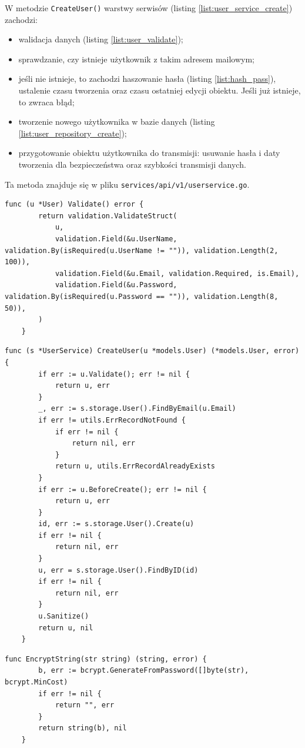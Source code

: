 W metodzie \texttt{CreateUser()} warstwy serwisów (listing \ref{list:user_service_create}) zachodzi:
\begin{itemize}
\item walidacja danych (listing \ref{list:user_validate});
\item sprawdzanie, czy istnieje użytkownik z takim adresem mailowym;
\item jeśli nie istnieje, to zachodzi haszowanie hasła (listing \ref{list:hash_pass}), ustalenie czasu tworzenia oraz czasu ostatniej edycji obiektu. Jeśli już istnieje, to zwraca błąd;
\item tworzenie nowego użytkownika w bazie danych (listing \ref{list:user_repository_create});
\item przygotowanie obiektu użytkownika do transmisji: usuwanie hasła i daty tworzenia dla bezpieczeństwa oraz szybkości transmisji danych.
\end{itemize}
Ta metoda znajduje się w pliku \texttt{services/api/v1/userservice.go}.


\begin{lstlisting}[label=list:user_validate,caption=Walidacja danych użytkownika.,basicstyle=\tiny\ttfamily]
    func (u *User) Validate() error {
        return validation.ValidateStruct(
            u,
            validation.Field(&u.UserName, validation.By(isRequired(u.UserName != "")), validation.Length(2, 100)),
            validation.Field(&u.Email, validation.Required, is.Email),
            validation.Field(&u.Password, validation.By(isRequired(u.Password == "")), validation.Length(8, 50)),
        )
    }
\end{lstlisting}
\begin{lstlisting}[label=list:user_service_create,caption=Serwis tworzenia użytkownika.,basicstyle=\tiny\ttfamily]
    func (s *UserService) CreateUser(u *models.User) (*models.User, error) {
        if err := u.Validate(); err != nil {
            return u, err
        }
        _, err := s.storage.User().FindByEmail(u.Email)
        if err != utils.ErrRecordNotFound {
            if err != nil {
                return nil, err
            }
            return u, utils.ErrRecordAlreadyExists
        }
        if err := u.BeforeCreate(); err != nil {
            return u, err
        }
        id, err := s.storage.User().Create(u)
        if err != nil {
            return nil, err
        }
        u, err = s.storage.User().FindByID(id)
        if err != nil {
            return nil, err
        }
        u.Sanitize()
        return u, nil
    }
\end{lstlisting}
\begin{lstlisting}[label=list:hash_pass,caption=Haszowanie hasła.,basicstyle=\tiny\ttfamily]
    func EncryptString(str string) (string, error) {
        b, err := bcrypt.GenerateFromPassword([]byte(str), bcrypt.MinCost)
        if err != nil {
            return "", err
        }
        return string(b), nil
    }
\end{lstlisting}

